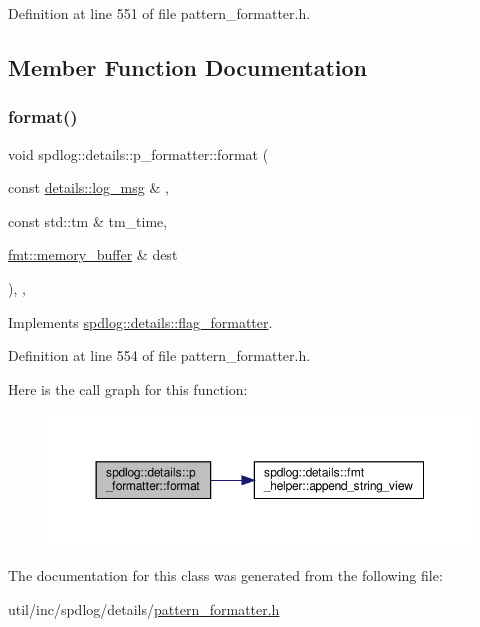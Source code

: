 Definition at line 551 of file pattern\+\_\+formatter.\+h.



\subsection{Member Function Documentation}
\mbox{\label{classspdlog_1_1details_1_1p__formatter_a18faf31df030e289f7166eaa7e6f1af1}} 
\subsubsection{\texorpdfstring{format()}{format()}}
{\footnotesize\ttfamily void spdlog\+::details\+::p\+\_\+formatter\+::format (\begin{DoxyParamCaption}\item[{const \hyperlink{structspdlog_1_1details_1_1log__msg}{details\+::log\+\_\+msg} \&}]{,  }\item[{const std\+::tm \&}]{tm\+\_\+time,  }\item[{\hyperlink{format_8h_a21cbf729f69302f578e6db21c5e9e0d2}{fmt\+::memory\+\_\+buffer} \&}]{dest }\end{DoxyParamCaption})\hspace{0.3cm}{\ttfamily [inline]}, {\ttfamily [override]}, {\ttfamily [virtual]}}



Implements \hyperlink{classspdlog_1_1details_1_1flag__formatter_a33fb3e42a4c8200cceb833d92b53fb67}{spdlog\+::details\+::flag\+\_\+formatter}.



Definition at line 554 of file pattern\+\_\+formatter.\+h.

Here is the call graph for this function\+:
\nopagebreak
\begin{figure}[H]
\begin{center}
\leavevmode
\includegraphics[width=350pt]{classspdlog_1_1details_1_1p__formatter_a18faf31df030e289f7166eaa7e6f1af1_cgraph}
\end{center}
\end{figure}


The documentation for this class was generated from the following file\+:\begin{DoxyCompactItemize}
\item 
util/inc/spdlog/details/\hyperlink{pattern__formatter_8h}{pattern\+\_\+formatter.\+h}\end{DoxyCompactItemize}

